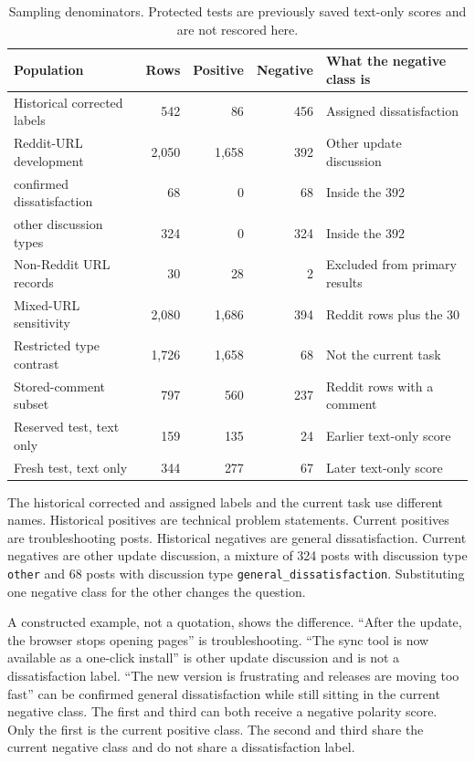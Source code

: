 \documentclass[conference,letterpaper]{IEEEtran}
\begin{document}
\begin{table}[t]
\caption{Sampling denominators. Protected tests are previously saved text-only scores and are not rescored here.}
\label{tab:counts}
\centering
\footnotesize
\begin{tabular}{lrrrl}
\toprule
Population & Rows & Positive & Negative & What the negative class is \\
\midrule
Historical corrected labels & 542 & 86 & 456 & Assigned dissatisfaction \\
Reddit-URL development & 2,050 & 1,658 & 392 & Other update discussion \\
\quad confirmed dissatisfaction & 68 & 0 & 68 & Inside the 392 \\
\quad other discussion types & 324 & 0 & 324 & Inside the 392 \\
Non-Reddit URL records & 30 & 28 & 2 & Excluded from primary results \\
Mixed-URL sensitivity & 2,080 & 1,686 & 394 & Reddit rows plus the 30 \\
Restricted type contrast & 1,726 & 1,658 & 68 & Not the current task \\
Stored-comment subset & 797 & 560 & 237 & Reddit rows with a comment \\
Reserved test, text only & 159 & 135 & 24 & Earlier text-only score \\
Fresh test, text only & 344 & 277 & 67 & Later text-only score \\
\bottomrule
\end{tabular}
\end{table}

The historical corrected and assigned labels and the current task use different names. Historical positives are technical problem statements. Current positives are troubleshooting posts. Historical negatives are general dissatisfaction. Current negatives are other update discussion, a mixture of 324 posts with discussion type \texttt{other} and 68 posts with discussion type \texttt{general\_dissatisfaction}. Substituting one negative class for the other changes the question.

A constructed example, not a quotation, shows the difference. ``After the update, the browser stops opening pages'' is troubleshooting. ``The sync tool is now available as a one-click install'' is other update discussion and is not a dissatisfaction label. ``The new version is frustrating and releases are moving too fast'' can be confirmed general dissatisfaction while still sitting in the current negative class. The first and third can both receive a negative polarity score. Only the first is the current positive class. The second and third share the current negative class and do not share a dissatisfaction label.
\end{document}

